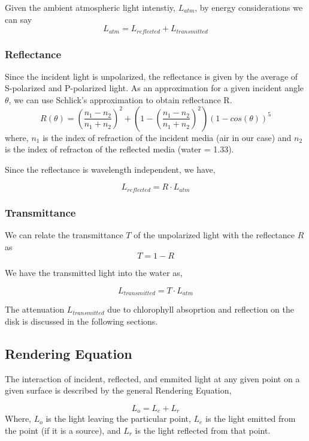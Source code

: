 \documentclass{article}
\begin{document}
Given the ambient atmospheric light intenstiy, $L_{atm}$, by energy considerations we can say
$$L_{atm} = L_{reflected}+L_{transmitted}$$

\subsubsection{Reflectance}
Since the incident light is unpolarized, the reflectance is given
by the average of S-polarized and P-polarized light. As an approximation
for a given incident angle $\theta$, we can use Schlick's approximation to obtain
reflectance R.
$$ R(\theta) = \left(\frac{n_1-n_2}{n_1+n_2}\right)^2 +
 \left(1-\left(\frac{n_1-n_2}{n_1+n_2}\right)^2\right)\left(1-cos(\theta)\right)^5 $$
where, $ n_1$ is the index of refraction of the incident media (air in our case)
and $ n_2$ is the index of refracton of the reflected media (water = 1.33).

Since the reflectance is wavelength independent, we have,

$$ L_{reflected} = R \cdot L_{atm}$$

\subsubsection{Transmittance}

We can relate the transmittance $ T$ of the unpolarized light with
the reflectance $ R$ as
$$ T = 1 - R$$

We have the transmitted light into the water as,

$$ L_{transmitted} = T \cdot L_{atm} $$

The attenuation $ L_{transmitted}$ due to chlorophyll absoprtion and reflection
on the disk is discussed in the following sections.



\subsection{Rendering Equation}

The interaction of incident, reflected, and emmited light at any given point on a
given surface is
described by the general Rendering Equation,

\begin{equation}
  L_o = L_e + L_r
\end{equation}
Where, $L_o$ is the light leaving the particular point, $ L_e$ is the light emitted
from the point (if it is a source), and $L_r $ is the light reflected from that point.
\end{document}
